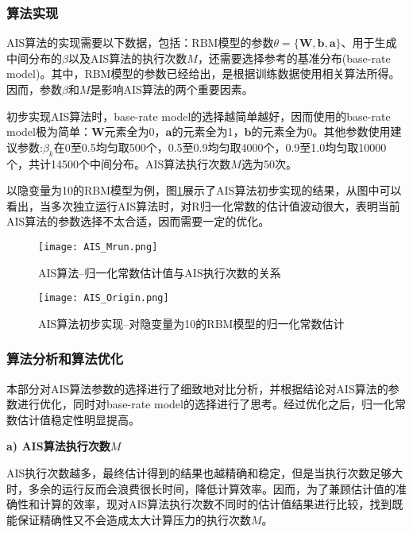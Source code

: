 \documentclass[11pt]{article}
\begin{document}
\subsubsection{算法实现}
AIS算法的实现需要以下数据，包括：RBM模型的参数$\theta = \{\mathbf{W},\mathbf{b},\mathbf{a}\}$、用于生成中间分布的$\beta$以及AIS算法的执行次数$M$，还需要选择参考的基准分布(base-rate model)。其中，RBM模型的参数已经给出，是根据训练数据使用相关算法所得。因而，参数$\beta$和$M$是影响AIS算法的两个重要因素。

初步实现AIS算法时，base-rate model的选择越简单越好，因而使用的base-rate model极为简单：$\mathbf{W}$元素全为0，$\mathbf{a}$的元素全为1，$\mathbf{b}$的元素全为0。其他参数使用建议参数:$\beta_{k}$在0至0.5均匀取500个，0.5至0.9均匀取4000个，0.9至1.0均匀取10000个，共计14500个中间分布。AIS算法执行次数$M$选为50次。

以隐变量为10的RBM模型为例，图\ref{RBM_AIS_Origin}展示了AIS算法初步实现的结果，从图中可以看出，当多次独立运行AIS算法时，对R归一化常数的估计值波动很大，表明当前AIS算法的参数选择不太合适，因而需要一定的优化。

\begin{figure}
\begin{minipage}[t]{0.5\linewidth}
    \centering
    \texttt{[image: AIS\_Mrun.png]}
    \caption{\scriptsize{AIS算法--归一化常数估计值与AIS执行次数的关系}}
    \label{RBM_AIS_Mrun}
\end{minipage}
\begin{minipage}[t]{0.5\linewidth}
    \centering
    \texttt{[image: AIS\_Origin.png]}
    \caption{\scriptsize{AIS算法初步实现--对隐变量为10的RBM模型的归一化常数估计}}
    \label{RBM_AIS_Origin}
\end{minipage}
\end{figure}

\subsubsection{算法分析和算法优化}
本部分对AIS算法参数的选择进行了细致地对比分析，并根据结论对AIS算法的参数进行优化，同时对base-rate model的选择进行了思考。经过优化之后，归一化常数估计值稳定性明显提高。

\noindent\textbf{a) AIS算法执行次数$M$}

AIS执行次数越多，最终估计得到的结果也越精确和稳定，但是当执行次数足够大时，多余的运行反而会浪费很长时间，降低计算效率。因而，为了兼顾估计值的准确性和计算的效率，现对AIS算法执行次数不同时的估计值结果进行比较，找到既能保证精确性又不会造成太大计算压力的执行次数$M$。
\end{document}
